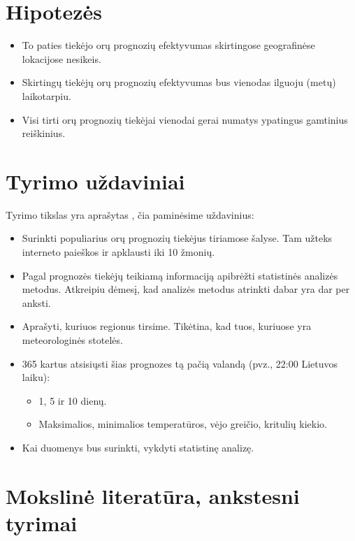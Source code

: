 \documentclass{article}
\begin{document}
\section{Hipotezės}

\begin{itemize}
    \item To paties tiekėjo orų prognozių efektyvumas skirtingose geografinėse
        lokacijose nesikeis.
    \item Skirtingų tiekėjų orų prognozių efektyvumas bus vienodas ilguoju
        (metų) laikotarpiu.
    \item Visi tirti orų prognozių tiekėjai vienodai gerai numatys ypatingus
        gamtinius reiškinius.
\end{itemize}

\section{Tyrimo uždaviniai}

Tyrimo tikslas yra aprašytas , čia paminėsime
uždavinius:

\begin{itemize}
    \item Surinkti populiarius orų prognozių tiekėjus tiriamose šalyse. Tam užteks
        interneto paieškos ir apklausti iki 10 žmonių.
    \item Pagal prognozės tiekėjų teikiamą informaciją apibrėžti statistinės
        analizės metodus. Atkreipiu dėmesį, kad analizės metodus atrinkti dabar
        yra dar per anksti.
    \item Aprašyti, kuriuos regionus tirsime. Tikėtina, kad tuos, kuriuose yra
        meteorologinės stotelės.
    \item 365 kartus atsisiųsti šias prognozes tą pačią valandą (pvz., 22:00
        Lietuvos laiku):
        \begin{itemize}
            \item 1, 5 ir 10 dienų.
            \item Maksimalios, minimalios temperatūros, vėjo greičio, kritulių kiekio.
        \end{itemize}
    \item Kai duomenys bus surinkti, vykdyti statistinę analizę.
\end{itemize}

\section{Mokslinė literatūra, ankstesni tyrimai}
\end{document}
